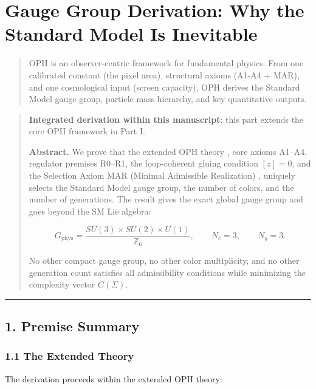 \section{Gauge Group Derivation: Why the Standard Model Is Inevitable}\label{gauge-group-derivation-why-the-standard-model-is-inevitable}

\begin{quote}
OPH is an observer-centric framework for fundamental physics. From one calibrated constant (the pixel area), structural axioms (A1-A4 + MAR), and one cosmological input (screen capacity), OPH derives the Standard Model gauge group, particle mass hierarchy, and key quantitative outputs.
\end{quote}

\begin{quote}
\textbf{Integrated derivation within this manuscript}: this part extends the core OPH framework in Part I.

\textbf{Abstract.} We prove that the extended OPH theory , core axioms A1--A4, regulator premises R0--R1, the loop-coherent gluing condition \([z]=0\), and the Selection Axiom MAR (Minimal Admissible Realization) , uniquely selects the Standard Model gauge group, the number of colors, and the number of generations. The result gives the exact global gauge group and goes beyond the SM Lie algebra:

\[G_{\mathrm{phys}} = \frac{SU(3) \times SU(2) \times U(1)}{\mathbb{Z}_6}, \qquad N_c = 3, \qquad N_g = 3.\]

No other compact gauge group, no other color multiplicity, and no other generation count satisfies all admissibility conditions while minimizing the complexity vector \(C(\Sigma)\).
\end{quote}

\begin{center}\rule{0.5\linewidth}{0.5pt}\end{center}

\subsection{1. Premise Summary}\label{1-premise-summary}

\subsubsection{1.1 The Extended Theory}\label{11-the-extended-theory}

The derivation proceeds within the extended OPH theory:

